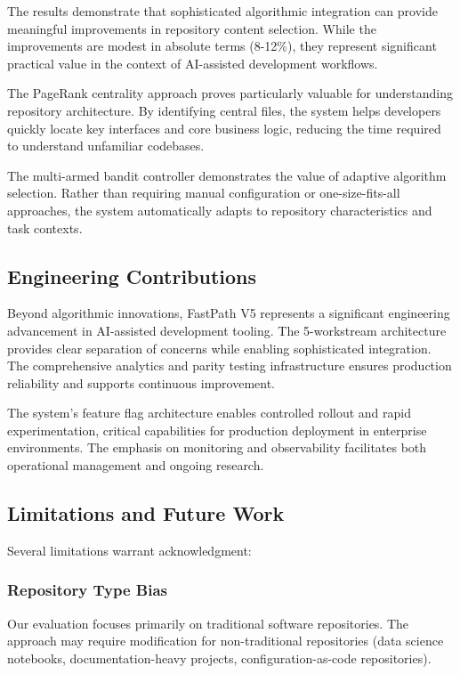 \documentclass[conference]{IEEEtran}
\begin{document}
The results demonstrate that sophisticated algorithmic integration can provide meaningful improvements in repository content selection. While the improvements are modest in absolute terms (8-12\%), they represent significant practical value in the context of AI-assisted development workflows.

The PageRank centrality approach proves particularly valuable for understanding repository architecture. By identifying central files, the system helps developers quickly locate key interfaces and core business logic, reducing the time required to understand unfamiliar codebases.

The multi-armed bandit controller demonstrates the value of adaptive algorithm selection. Rather than requiring manual configuration or one-size-fits-all approaches, the system automatically adapts to repository characteristics and task contexts.

\subsection{Engineering Contributions}

Beyond algorithmic innovations, FastPath V5 represents a significant engineering advancement in AI-assisted development tooling. The 5-workstream architecture provides clear separation of concerns while enabling sophisticated integration. The comprehensive analytics and parity testing infrastructure ensures production reliability and supports continuous improvement.

The system's feature flag architecture enables controlled rollout and rapid experimentation, critical capabilities for production deployment in enterprise environments. The emphasis on monitoring and observability facilitates both operational management and ongoing research.

\subsection{Limitations and Future Work}

Several limitations warrant acknowledgment:

\subsubsection{Repository Type Bias}
Our evaluation focuses primarily on traditional software repositories. The approach may require modification for non-traditional repositories (data science notebooks, documentation-heavy projects, configuration-as-code repositories).
\end{document}
